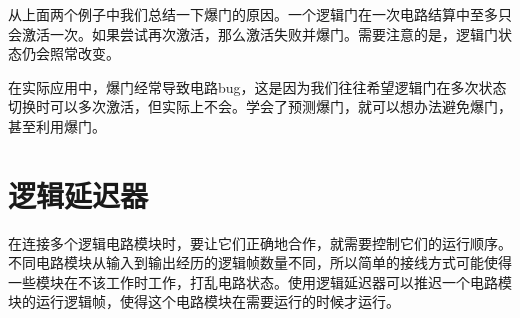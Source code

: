 \begin{figure}
\begin{center}
\qquad
{}
\qquad
{}
\end{center}
\caption{}\label{i306:308}
\end{figure}

从上面两个例子中我们总结一下爆门的原因。一个逻辑门在一次电路结算中至多只会激活一次。如果尝试再次激活，那么激活失败并爆门。需要注意的是，逻辑门状态仍会照常改变。

在实际应用中，爆门经常导致电路bug，这是因为我们往往希望逻辑门在多次状态切换时可以多次激活，但实际上不会。学会了预测爆门，就可以想办法避免爆门，甚至利用爆门。

\section{逻辑延迟器}

在连接多个逻辑电路模块时，要让它们正确地合作，就需要控制它们的运行顺序。不同电路模块从输入到输出经历的逻辑帧数量不同，所以简单的接线方式可能使得一些模块在不该工作时工作，打乱电路状态。使用逻辑延迟器可以推迟一个电路模块的运行逻辑帧，使得这个电路模块在需要运行的时候才运行。

